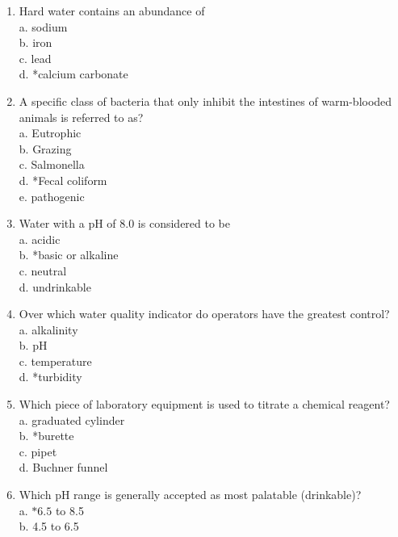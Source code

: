 
\begin{enumerate}[1.]
\item Hard water contains an abundance of\\
a. sodium\\
b. iron\\
c. lead\\
d. *calcium carbonate\\
\item A specific class of bacteria that only inhibit the intestines of warm-blooded animals is referred to as?\\
a. Eutrophic\\
b. Grazing\\
c. Salmonella\\
d. *Fecal coliform\\
e. pathogenic\\
\item Water with a $\mathrm{pH}$ of 8.0 is considered to be\\
a. acidic\\
b. *basic or alkaline\\
c. neutral\\
d. undrinkable\\
\item Over which water quality indicator do operators have the greatest control?\\
a. alkalinity\\
b. $\mathrm{pH}$\\
c. temperature\\
d. *turbidity\\
\item Which piece of laboratory equipment is used to titrate a chemical reagent?\\
a. graduated cylinder\\
b. *burette\\
c. pipet\\
d. Buchner funnel\\
\item Which $\mathrm{pH}$ range is generally accepted as most palatable (drinkable)?\\
a. $* 6.5$ to 8.5\\
b. 4.5 to 6.5\\

\end{enumerate}

